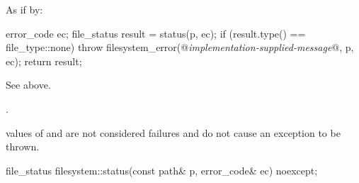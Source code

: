 \begin{itemdescr}
\pnum
\effects
As if by:
\begin{codeblock}
error_code ec;
file_status result = status(p, ec);
if (result.type() == file_type::none)
  throw filesystem_error(@\textit{implementation-supplied-message}@, p, ec);
return result;
\end{codeblock}

\pnum
\returns
See above.

\pnum
\throws
{}.
\begin{note}
 values of 
  and  are not considered failures and do not
  cause an exception to be thrown.
\end{note}
\end{itemdescr}

%
\begin{itemdecl}
file_status filesystem::status(const path& p, error_code& ec) noexcept;
\end{itemdecl}

